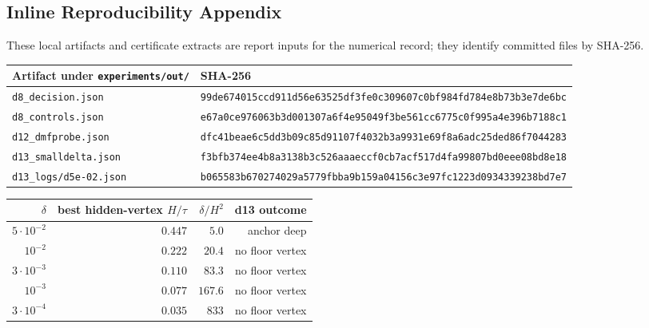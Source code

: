 \subsection{Inline Reproducibility Appendix}

\begin{warning}
\numbadge These local artifacts and certificate extracts are report inputs for
the numerical record; they identify committed files by SHA-256.
\end{warning}

\begin{center}
\tiny
\begin{tabular}{@{}p{}p{}@{}}
\toprule
Artifact under \texttt{experiments/out/} & SHA-256 \\
\midrule
\texttt{d8\_decision.json} & \texttt{99de674015ccd911d56e63525df3fe0c309607c0bf984fd784e8b73b3e7de6bc} \\
\texttt{d8\_controls.json} & \texttt{e67a0ce976063b3d001307a6f4e95049f3be561cc6775c0f995a4e396b7188c1} \\
\texttt{d12\_dmfprobe.json} & \texttt{dfc41beae6c5dd3b09c85d91107f4032b3a9931e69f8a6adc25ded86f7044283} \\
\texttt{d13\_smalldelta.json} & \texttt{f3bfb374ee4b8a3138b3c526aaaeccf0cb7acf517d4fa99807bd0eee08bd8e18} \\
\texttt{d13\_logs/d5e-02.json} & \texttt{b065583b670274029a5779fbba9b159a04156c3e97fc1223d0934339238bd7e7} \\
\bottomrule
\end{tabular}
\end{center}

\begin{center}
\small
\begin{tabular}{@{}rrrr@{}}
\toprule
\(\delta\) & best hidden-vertex \(H/\tau\) & \(\delta/H^2\) & d13 outcome \\
\midrule
\(5\cdot10^{-2}\) & \(0.447\) & \(5.0\) & anchor deep \\
\(10^{-2}\) & \(0.222\) & \(20.4\) & no floor vertex \\
\(3\cdot10^{-3}\) & \(0.110\) & \(83.3\) & no floor vertex \\
\(10^{-3}\) & \(0.077\) & \(167.6\) & no floor vertex \\
\(3\cdot10^{-4}\) & \(0.035\) & \(833\) & no floor vertex \\
\bottomrule
\end{tabular}
\end{center}

